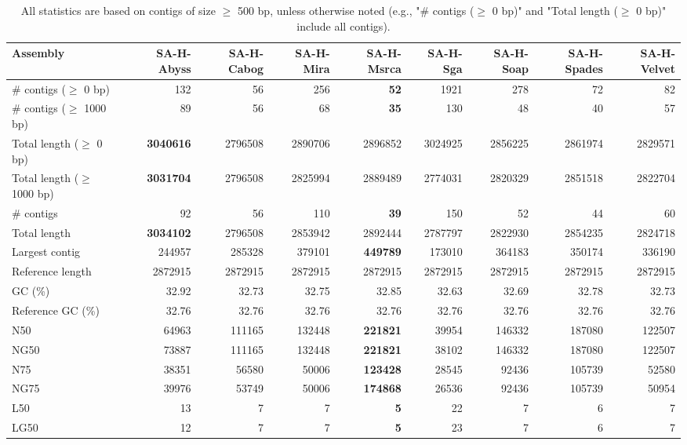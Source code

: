 \documentclass[12pt,a4paper]{article}
\begin{document}
\begin{table}[ht]
\begin{center}
\caption{All statistics are based on contigs of size $\geq$ 500 bp, unless otherwise noted (e.g., "\# contigs ($\geq$ 0 bp)" and "Total length ($\geq$ 0 bp)" include all contigs).}
\begin{tabular}{|l*{8}{|r}|}
\hline
Assembly & SA-H-Abyss & SA-H-Cabog & SA-H-Mira & SA-H-Msrca & SA-H-Sga & SA-H-Soap & SA-H-Spades & SA-H-Velvet \\ \hline
\# contigs ($\geq$ 0 bp) & 132 & 56 & 256 & {\bf 52} & 1921 & 278 & 72 & 82 \\ \hline
\# contigs ($\geq$ 1000 bp) & 89 & 56 & 68 & {\bf 35} & 130 & 48 & 40 & 57 \\ \hline
Total length ($\geq$ 0 bp) & {\bf 3040616} & 2796508 & 2890706 & 2896852 & 3024925 & 2856225 & 2861974 & 2829571 \\ \hline
Total length ($\geq$ 1000 bp) & {\bf 3031704} & 2796508 & 2825994 & 2889489 & 2774031 & 2820329 & 2851518 & 2822704 \\ \hline
\# contigs & 92 & 56 & 110 & {\bf 39} & 150 & 52 & 44 & 60 \\ \hline
Total length & {\bf 3034102} & 2796508 & 2853942 & 2892444 & 2787797 & 2822930 & 2854235 & 2824718 \\ \hline
Largest contig & 244957 & 285328 & 379101 & {\bf 449789} & 173010 & 364183 & 350174 & 336190 \\ \hline
Reference length & 2872915 & 2872915 & 2872915 & 2872915 & 2872915 & 2872915 & 2872915 & 2872915 \\ \hline
GC (\%) & 32.92 & 32.73 & 32.75 & 32.85 & 32.63 & 32.69 & 32.78 & 32.73 \\ \hline
Reference GC (\%) & 32.76 & 32.76 & 32.76 & 32.76 & 32.76 & 32.76 & 32.76 & 32.76 \\ \hline
N50 & 64963 & 111165 & 132448 & {\bf 221821} & 39954 & 146332 & 187080 & 122507 \\ \hline
NG50 & 73887 & 111165 & 132448 & {\bf 221821} & 38102 & 146332 & 187080 & 122507 \\ \hline
N75 & 38351 & 56580 & 50006 & {\bf 123428} & 28545 & 92436 & 105739 & 52580 \\ \hline
NG75 & 39976 & 53749 & 50006 & {\bf 174868} & 26536 & 92436 & 105739 & 50954 \\ \hline
L50 & 13 & 7 & 7 & {\bf 5} & 22 & 7 & 6 & 7 \\ \hline
LG50 & 12 & 7 & 7 & {\bf 5} & 23 & 7 & 6 & 7 \\ \hline

\end{tabular}
\end{center}
\end{table}
\end{document}
